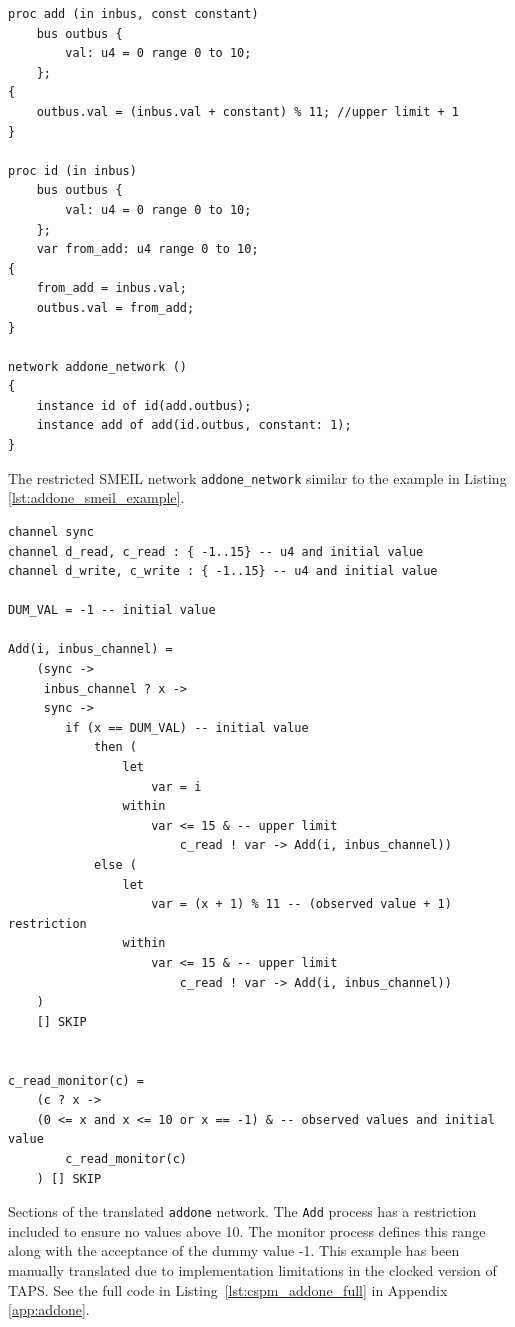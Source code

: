 \begin{listing}
\begin{verbatim}
proc add (in inbus, const constant)
    bus outbus {
        val: u4 = 0 range 0 to 10;
    };
{
    outbus.val = (inbus.val + constant) % 11; //upper limit + 1
}

proc id (in inbus)
    bus outbus {
        val: u4 = 0 range 0 to 10;
    };
    var from_add: u4 range 0 to 10;
{
    from_add = inbus.val;
    outbus.val = from_add;
}

network addone_network ()
{
    instance id of id(add.outbus);
    instance add of add(id.outbus, constant: 1);
}
\end{verbatim}
\caption{The restricted SMEIL network \texttt{addone\_network} similar to the example in Listing \ref{lst:addone_smeil_example}.}
\label{lst:addone_mod_example}
\end{listing}
\begin{listing}
\begin{verbatim}
channel sync
channel d_read, c_read : { -1..15} -- u4 and initial value
channel d_write, c_write : { -1..15} -- u4 and initial value

DUM_VAL = -1 -- initial value

Add(i, inbus_channel) =
    (sync ->
     inbus_channel ? x ->
     sync ->
        if (x == DUM_VAL) -- initial value
            then (
                let
                    var = i
                within
                    var <= 15 & -- upper limit
                        c_read ! var -> Add(i, inbus_channel))
            else (
                let
                    var = (x + 1) % 11 -- (observed value + 1) restriction
                within
                    var <= 15 & -- upper limit
                        c_read ! var -> Add(i, inbus_channel))
    )
    [] SKIP


c_read_monitor(c) =
    (c ? x ->
    (0 <= x and x <= 10 or x == -1) & -- observed values and initial value
        c_read_monitor(c)
    ) [] SKIP

\end{verbatim}
\caption{Sections of the translated \texttt{addone} network. The \texttt{Add} process has a restriction included to ensure no values above 10. The monitor process defines this range along with the acceptance of the dummy value -1. This example has been manually translated due to implementation limitations in the clocked version of TAPS. See the full code in Listing~\ref{lst:cspm_addone_full} in Appendix \ref{app:addone}.}
\label{lst:cspm_addone_restricted}
\end{listing}
